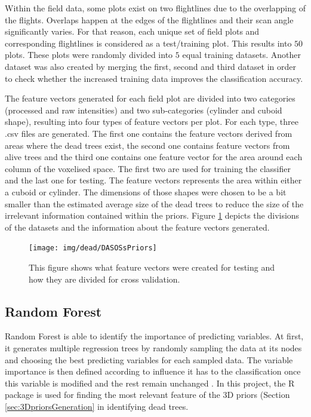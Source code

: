 \documentclass{subfiles}
\begin{document}
\par Within the field data, some plots exist on two flightlines due to the overlapping of the flights. Overlaps happen at the edges of the flightlines and their scan angle significantly varies. For that reason,  each unique set of field plots and corresponding flightlines is considered as a test/training plot. This results into $50$ plots. These plots were randomly divided into $5$ equal training datasets. Another dataset was also created by merging the first, second and third dataset in order to check whether the increased training data improves the classification accuracy.

\par {\color{blue} The feature vectors generated for each field plot are divided into two categories (processed and raw intensities) and two sub-categories (cylinder and cuboid shape), resulting into four types of feature vectors per plot. For each type, three .csv files are generated. The first one contains the feature vectors derived from areas where the dead trees exist, the second one contains feature vectors from alive trees and the third one contains one feature vector for the area around each column of the voxelised space. The first two are used for training the classifier and the last one for testing. The feature vectors represents the area within either a cuboid or cylinder. The dimensions of those shapes were chosen to be a bit smaller than the estimated average size of the dead trees to reduce the size of the irrelevant information contained within the priors. Figure \ref{fig:DASOSsPriors} depicts the divisions of the datasets and the information about the feature vectors generated. }


\begin{figure} [h!]
	\centering
	\texttt{[image: img/dead/DASOSsPriors]}
	\caption{This figure shows what feature vectors were created for testing and how they are divided for cross validation.}
	\label{fig:DASOSsPriors}
\end{figure}


	

	
\subsection{Random Forest}\label{sec:RandomForest}
	
	
	\par Random Forest is able to identify the importance of predicting variables. At first, it generates multiple regression trees by randomly sampling the data at its nodes and choosing the best predicting variables for each sampled data. The variable importance is then defined according to influence it has to the classification once this variable is modified and the rest remain unchanged \cite{Liaw2002}. In this project, the R package is used for finding the most relevant feature of the 3D priors (Section \ref{sec:3DpriorsGeneration} in identifying dead trees. 
\end{document}
